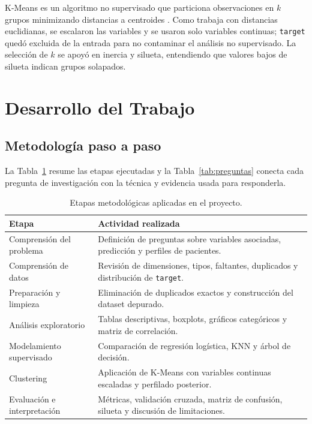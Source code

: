 \documentclass[10pt,a4paper]{article}
\begin{document}
K-Means es un algoritmo no supervisado que particiona observaciones en $k$ grupos minimizando distancias a centroides \citep{macqueen1967,levano2026clustering,levano2026kmeans}. Como trabaja con distancias euclidianas, se escalaron las variables y se usaron solo variables continuas; \texttt{target} quedó excluida de la entrada para no contaminar el análisis no supervisado. La selección de $k$ se apoyó en inercia y silueta, entendiendo que valores bajos de silueta indican grupos solapados.

\section{Desarrollo del Trabajo}

\subsection{Metodología paso a paso}

La Tabla~\ref{tab:metodologia} resume las etapas ejecutadas y la Tabla~\ref{tab:preguntas} conecta cada pregunta de investigación con la técnica y evidencia usada para responderla.

\begin{table}[H]
\centering
\small
\begin{tabularx}{\textwidth}{p{3.2cm}X}
\toprule
Etapa & Actividad realizada \\
\midrule
Comprensión del problema & Definición de preguntas sobre variables asociadas, predicción y perfiles de pacientes. \\
Comprensión de datos & Revisión de dimensiones, tipos, faltantes, duplicados y distribución de \texttt{target}. \\
Preparación y limpieza & Eliminación de duplicados exactos y construcción del dataset depurado. \\
Análisis exploratorio & Tablas descriptivas, boxplots, gráficos categóricos y matriz de correlación. \\
Modelamiento supervisado & Comparación de regresión logística, KNN y árbol de decisión. \\
Clustering & Aplicación de K-Means con variables continuas escaladas y perfilado posterior. \\
Evaluación e interpretación & Métricas, validación cruzada, matriz de confusión, silueta y discusión de limitaciones. \\
\bottomrule
\end{tabularx}
\caption{Etapas metodológicas aplicadas en el proyecto.}
\label{tab:metodologia}
\end{table}
\end{document}
